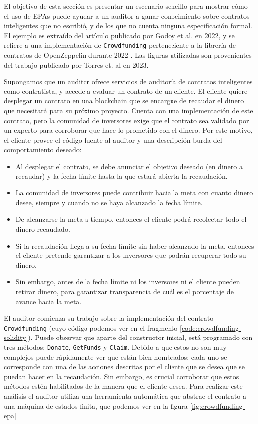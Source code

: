 El objetivo de esta sección es presentar un escenario sencillo para mostrar cómo el uso de EPAs puede ayudar a un auditor a ganar conocimiento sobre contratos inteligentes que no escribió, y de los que no cuenta ninguna especificación formal.
El ejemplo es extraído del artículo publicado por Godoy et al. en 2022\cite{predicate-abstraction-for-smart-contract-validation}, y se refiere a una implementación de \texttt{Crowdfunding} perteneciente a la librería de contratos de OpenZeppelin durante 2022 \cite{open-zeppelin-library}.
Las figuras utilizadas son provenientes del trabajo publicado por Torres et. al en 2023\cite{Torres}.

Supongamos que un auditor ofrece servicios de auditoría de contratos inteligentes como contratista, y accede a evaluar un contrato de un cliente.
El cliente quiere desplegar un contrato en una blockchain que se encargue de recaudar el dinero que necesitará para su próximo proyecto.
Cuenta con una implementación de este contrato, pero la comunidad de inversores exige que el contrato sea validado por un experto para corroborar que hace lo prometido con el dinero.
Por este motivo, el cliente provee el código fuente al auditor y una descripción burda del comportamiento deseado:
\begin{itemize}
    \item Al desplegar el contrato, se debe anunciar el objetivo deseado (en dinero a recaudar) y la fecha límite hasta la que estará abierta la recaudación.
    \item La comunidad de inversores puede contribuir hacia la meta con cuanto dinero desee, siempre y cuando no se haya alcanzado la fecha límite.
    \item De alcanzarse la meta a tiempo, entonces el cliente podrá recolectar todo el dinero recaudado.
    \item Si la recaudación llega a su fecha límite sin haber alcanzado la meta, entonces el cliente pretende garantizar a los inversores que podrán recuperar todo su dinero.
    \item Sin embargo, antes de la fecha límite ni los inversores ni el cliente pueden retirar dinero, para garantizar transparencia de cuál es el porcentaje de avance hacia la meta.
\end{itemize}

El auditor comienza su trabajo sobre la implementación del contrato \texttt{Crowdfunding} (cuyo código podemos ver en el fragmento \ref{code:crowdfunding-solidity}).
Puede observar que aparte del constructor inicial, está programado con tres métodos: \texttt{Donate}, \texttt{GetFunds} y \texttt{Claim}.
Debido a que estos no son muy complejos puede rápidamente ver que están bien nombrados; cada uno se corresponde con una de las acciones descritas por el cliente que se desea que se puedan hacer en la recaudación.
Sin embargo, es crucial corroborar que estos métodos estén habilitados de la manera que el cliente desea.
Para realizar este análisis el auditor utiliza una herramienta automática que abstrae el contrato a una máquina de estados finita, que podemos ver en la figura \ref{fig:crowdfunding-epa}

